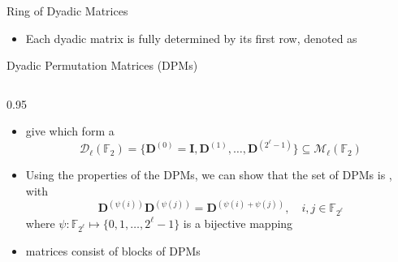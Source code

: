 \documentclass[10pt, aspectratio=169]{beamer}
\newcommand{\bD}{\mathbf{D}}
\newcommand{\bM}{\mathbf{M}}
\newcommand{\bI}{\mathbf{I}}
\newcommand{\Ftwo}{\mathbb{F}_{2}}
\newcommand{\dyadicAblock}[1]{\textcolor{myred}{#1}}
\newcommand{\dyadicBblock}[1]{\textcolor{KITblue}{#1}}
\newcommand{\dyadicfour}[4]{%
  \begin{pmatrix}
    \dyadicAblock{#1} & \dyadicAblock{#2} & \dyadicBblock{#3} & \dyadicBblock{#4}\\
    \dyadicAblock{#2} & \dyadicAblock{#1} & \dyadicBblock{#4} & \dyadicBblock{#3}\\
    \dyadicBblock{#3} & \dyadicBblock{#4} & \dyadicAblock{#1} & \dyadicAblock{#2}\\
    \dyadicBblock{#4} & \dyadicBblock{#3} & \dyadicAblock{#2} & \dyadicAblock{#1}
  \end{pmatrix}}
\begin{document}
\begin{frame}[c]{Ring of Dyadic Matrices}
\begin{itemize}
\begin{align*}
{\begin{array}{@{}cccccccc@{}}
        \dyadicfour{0}{1}{0}{0}, &
        \dyadicfour{0}{1}{1}{1}, &
        \dyadicfour{0}{1}{0}{1}, &
        \dyadicfour{0}{1}{1}{0}, &
        \dyadicfour{1}{0}{0}{0}, &
        \dyadicfour{1}{0}{1}{1}, &
        \dyadicfour{1}{0}{0}{1}, &
        \dyadicfour{1}{0}{1}{0}\textcolor{white}{,}
      \end{array}
      \right\}
      $}\\
    \vdots
  \end{align*}
\pause
\vspace{-1em}
      \item Each dyadic matrix is fully determined by its first row, denoted as 



  \end{itemize}

  \endgroup
\end{frame}

\begin{frame}[c]{Dyadic Permutation Matrices (DPMs)}
  \begin{columns}[T,onlytextwidth]
    \begin{column}{0.95\textwidth}

      \begin{itemize}
        \item {} give  which form a 
      \[
        \mathcal{D}_{\ell}(\Ftwo)
        =\{\bD^{(0)}=\bI,\bD^{(1)},\ldots,\bD^{(2^\ell-1)}\}
        \subseteq \mathcal{M}_{\ell}(\Ftwo)
      \]
      
        \vspace{2em}
        
        \item Using the properties of the DPMs, we can show that the set of DPMs is , with
        \[
          \bD^{(\psi(i))}\bD^{(\psi(j))}=\bD^{(\psi(i) +  \psi(j))}, \quad i,j\in \mathbb{F}_{2^{\ell}}
        \]
        where $\psi: \mathbb{F}_{2^{\ell}}\mapsto \{0,1,\ldots, 2^{\ell}-1\}$ is a bijective mapping
        
 \vspace{2em}
 \pause
        \item {} matrices consist of blocks of DPMs

      \end{itemize}


    \end{column}
  \end{columns}
\end{frame}
\end{document}
